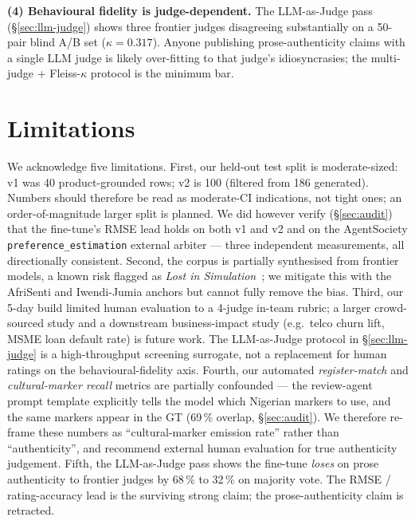 \documentclass[sigconf,nonacm,balance]{acmart}
\begin{document}
\textbf{(4) Behavioural fidelity is judge-dependent.} The LLM-as-Judge
pass (§\ref{sec:llm-judge}) shows three frontier judges disagreeing
substantially on a 50-pair blind A/B set ($\kappa = 0.317$). Anyone
publishing prose-authenticity claims with a single LLM judge is
likely over-fitting to that judge's idiosyncrasies; the multi-judge
+ Fleiss-$\kappa$ protocol is the minimum bar.

\section{Limitations}
\label{sec:limitations}

We acknowledge five limitations. First, our held-out test split is
moderate-sized: v1 was 40 product-grounded rows; v2 is 100 (filtered
from 186 generated). Numbers should therefore be read as moderate-CI
indications, not tight ones; an order-of-magnitude larger split is
planned. We did however verify (§\ref{sec:audit}) that the fine-tune's
RMSE lead holds on both v1 and v2 and on the AgentSociety
\texttt{preference\_estimation} external arbiter --- three independent
measurements, all directionally consistent.
Second, the corpus is partially synthesised from frontier models, a
known risk flagged as \emph{Lost in Simulation}~\cite{lostinsimulation};
we mitigate this with the AfriSenti and Iwendi-Jumia anchors but
cannot fully remove the bias.
Third, our 5-day build limited human evaluation to a 4-judge in-team
rubric; a larger crowd-sourced study and a downstream business-impact
study (e.g.\ telco churn lift, MSME loan default rate) is future work.
The LLM-as-Judge protocol in §\ref{sec:llm-judge} is a
high-throughput screening surrogate, not a replacement for human
ratings on the behavioural-fidelity axis.
Fourth, our automated \emph{register-match} and \emph{cultural-marker
recall} metrics are partially confounded --- the review-agent prompt
template explicitly tells the model which Nigerian markers to use,
and the same markers appear in the GT (69\,\% overlap,
§\ref{sec:audit}). We therefore re-frame these numbers as
``cultural-marker emission rate'' rather than ``authenticity'', and
recommend external human evaluation for true authenticity judgement.
Fifth, the LLM-as-Judge pass shows the fine-tune \emph{loses} on
prose authenticity to frontier judges by 68\,\% to 32\,\% on majority
vote. The RMSE / rating-accuracy lead is the surviving strong claim;
the prose-authenticity claim is retracted.
\end{document}
